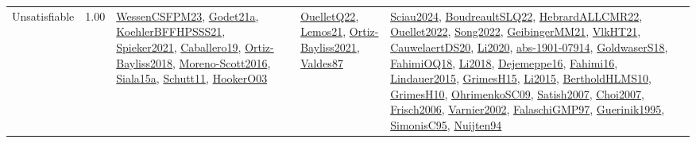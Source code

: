 {\begin{longtable}{p{3cm}r>{\raggedright\arraybackslash}p{6cm}>{\raggedright\arraybackslash}p{6cm}>{\raggedright\arraybackslash}p{8cm}}
\index{Unsatisfiable}\index{Concepts!Unsatisfiable}Unsatisfiable &  1.00 & \hyperref[detail:WessenCSFPM23]{WessenCSFPM23}, \hyperref[detail:Godet21a]{Godet21a}, \hyperref[detail:KoehlerBFFHPSSS21]{KoehlerBFFHPSSS21}, \hyperref[detail:Spieker2021]{Spieker2021}, \hyperref[detail:Caballero19]{Caballero19}, \hyperref[detail:Ortiz-Bayliss2018]{Ortiz-Bayliss2018}, \hyperref[detail:Moreno-Scott2016]{Moreno-Scott2016}, \hyperref[detail:Siala15a]{Siala15a}, \hyperref[detail:Schutt11]{Schutt11}, \hyperref[detail:HookerO03]{HookerO03} & \hyperref[detail:OuelletQ22]{OuelletQ22}, \hyperref[detail:Lemos21]{Lemos21}, \hyperref[detail:Ortiz-Bayliss2021]{Ortiz-Bayliss2021}, \hyperref[detail:Valdes87]{Valdes87} & \hyperref[detail:Sciau2024]{Sciau2024}, \hyperref[detail:BoudreaultSLQ22]{BoudreaultSLQ22}, \hyperref[detail:HebrardALLCMR22]{HebrardALLCMR22}, \hyperref[detail:Ouellet2022]{Ouellet2022}, \hyperref[detail:Song2022]{Song2022}, \hyperref[detail:GeibingerMM21]{GeibingerMM21}, \hyperref[detail:VlkHT21]{VlkHT21}, \hyperref[detail:CauwelaertDS20]{CauwelaertDS20}, \hyperref[detail:Li2020]{Li2020}, \hyperref[detail:abs-1901-07914]{abs-1901-07914}, \hyperref[detail:GoldwaserS18]{GoldwaserS18}, \hyperref[detail:FahimiOQ18]{FahimiOQ18}, \hyperref[detail:Li2018]{Li2018}, \hyperref[detail:Dejemeppe16]{Dejemeppe16}, \hyperref[detail:Fahimi16]{Fahimi16}, \hyperref[detail:Lindauer2015]{Lindauer2015}, \hyperref[detail:GrimesH15]{GrimesH15}, \hyperref[detail:Li2015]{Li2015}, \hyperref[detail:BertholdHLMS10]{BertholdHLMS10}, \hyperref[detail:GrimesH10]{GrimesH10}, \hyperref[detail:OhrimenkoSC09]{OhrimenkoSC09}, \hyperref[detail:Satish2007]{Satish2007}, \hyperref[detail:Choi2007]{Choi2007}, \hyperref[detail:Frisch2006]{Frisch2006}, \hyperref[detail:Varnier2002]{Varnier2002}, \hyperref[detail:FalaschiGMP97]{FalaschiGMP97}, \hyperref[detail:Guerinik1995]{Guerinik1995}, \hyperref[detail:SimonisC95]{SimonisC95}, \hyperref[detail:Nuijten94]{Nuijten94}\\

\end{longtable}}
